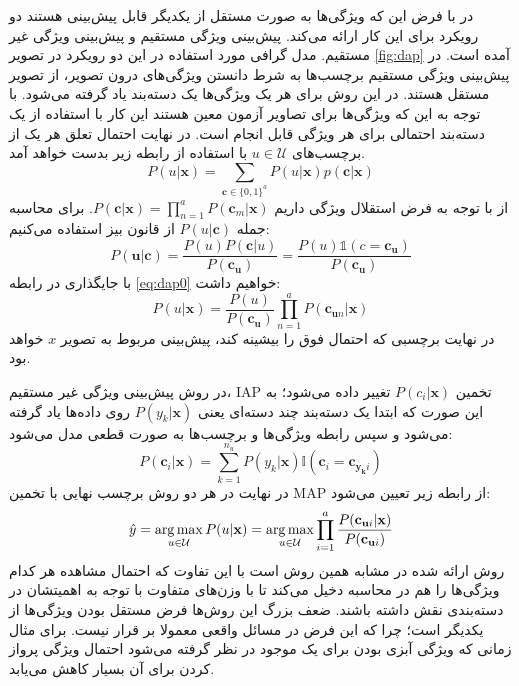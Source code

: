 در
\cite{lampert09}
با فرض این که ویژگی‌ها به صورت مستقل از یکدیگر قابل پیش‌بینی هستند دو رویکرد برای این کار ارائه می‌کند. پیش‌بینی ویژگی مستقیم
و پیش‌بینی ویژگی غیر مستقیم.
 مدل گرافی مورد استفاده در این دو رویکرد در تصویر \ref{fig:dap} آمده است. در پیش‌بینی ویژگی مستقیم برچسب‌ها به شرط دانستن ویژگی‌های درون تصویر، از تصویر مستقل هستند. در این روش برای هر یک ویژگی‌ها یک دسته‌بند یاد گرفته می‌شود. با توجه به این که ویژگی‌ها برای تصاویر آزمون معین هستند این کار با استفاده از یک دسته‌بند احتمالی برای هر ویژگی قابل انجام است. در نهایت احتمال تعلق هر یک از برچسب‌های
$ u \in \mathcal{U} $
با استفاده از رابطه زیر بدست خواهد آمد.
\begin{equation} \label{eq:dap0}
  P(u | \mathbf{x}  ) = \sum_{\mathbf{c} \in \{0,1\}^a} P(u | \mathbf{x} ) p(\mathbf{c} |\mathbf{x} )
\end{equation}
از با توجه به فرض استقلال ویژگی داریم
$P(\mathbf{c} |\mathbf{x} ) = \prod_{n=1}^a P(\mathbf{c} _m |\mathbf{x} )$.
برای محاسبه جمله 
$P(u | \mathbf{c} )$ 
از قانون بیز استفاده می‌کنیم:
\[
P(\mathbf{u}  | \mathbf{c} ) = \frac{P(u)P(\mathbf{c} |u)}{P(\mathbf{c_u} )}  = \frac {P(u) \mathds{1}(c= \mathbf{c_u} )} {P(\mathbf{c_u} )}
\]
با جایگذاری در رابطه \eqref{eq:dap0} خواهیم داشت:
\begin{equation}
  P(u | \mathbf{x}  ) = \frac{P(u)}{P(\mathbf{c_u} )} \prod_{n=1}^a P(\mathbf{c}_{\mathbf{u} n}|\mathbf{x} )
\end{equation}
در نهایت برچسبی که احتمال فوق را بیشینه کند، پیش‌بینی مربوط به تصویر $x$ خواهد بود.

در روش پیش‌بینی ویژگی غیر مستقیم، IAP
 تخمین  $P(c_i|\mathbf{x}) $ تغییر داده می‌شود؛ به این صورت که ابتدا یک دسته‌بند چند دسته‌ای یعنی $P(y_k |\mathbf{x})$ روی داده‌ها یاد گرفته می‌شود و سپس رابطه ویژگی‌ها و برچسب‌ها به صورت قطعی مدل می‌شود:
\begin{equation}
P(\mathbf{c}_i | \mathbf{x}) = \sum_{k=1}^{n_u} P(y_k | \mathbf{x}) \mathbb{I}(\mathbf{c}_i = \mathbf{c}_{\mathbf{y_k}i})
\end{equation}
در نهایت در هر دو روش برچسب نهایی با تخمین MAP
از رابطه زیر تعیین می‌شود:
\begin{equation}
\hat{y} = \operatorname*{arg\,max}_{u \in \mathcal{U}} P(u|\mathbf{x}) =  \operatorname*{arg\,max}_{u \in \mathcal{U}} \prod_{i=1}^a \frac{P(\mathbf{c}_{\mathbf{u}i} | \mathbf{x})}{P(\mathbf{c}_{\mathbf{u}i})}
\end{equation}
روش ارائه شده در
\cite{suzuki14}
مشابه همین روش است با این تفاوت که احتمال مشاهده هر کدام ویژگی‌ها را هم در محاسبه دخیل می‌کند تا با وزن‌های متفاوت با توجه به اهمیتشان در دسته‌بندی نقش داشته باشند. ضعف بزرگ این روش‌ها فرض مستقل بودن ویژگی‌ها از یکدیگر است؛ چرا که این فرض در مسائل واقعی معمولا بر قرار نیست. برای مثال زمانی که ویژگی آبزی بودن برای یک موجود در نظر گرفته می‌شود احتمال ویژگی پرواز کردن برای آن بسیار کاهش می‌یابد.
